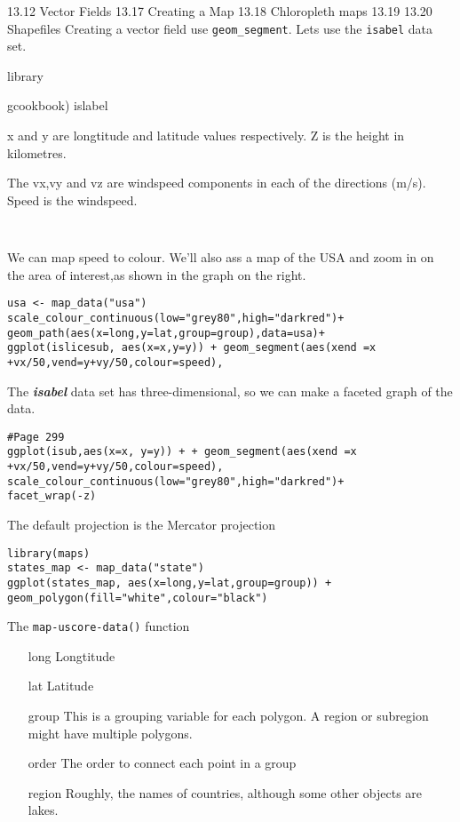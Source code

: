 13.12 Vector Fields
13.17 Creating a Map
13.18 Chloropleth maps
13.19 
13.20 Shapefiles
Creating a vector field
use \texttt{geom_segment}. Lets use the \texttt{isabel} data set.


library{gcookbook)
islabel

x and y are longtitude and latitude values respectively.
Z is the height in kilometres.

The vx,vy and vz are windspeed components in each of the directions (m/s).
Speed is the windspeed.

\begin{framed}
\begin{verbatim}


\end{verbatim}
\end{framed}

We can map speed to colour. We'll also ass a map of 
the USA and zoom in on the area of interest,as shown in the graph on the right.

\begin{verbatim}
usa <- map_data("usa")
scale_colour_continuous(low="grey80",high="darkred")+
geom_path(aes(x=long,y=lat,group=group),data=usa)+
ggplot(islicesub, aes(x=x,y=y)) + geom_segment(aes(xend =x +vx/50,vend=y+vy/50,colour=speed),
\end{verbatim}
The \textbf{\textit{isabel}} data set has three-dimensional, so we can make a faceted graph of the data.

\begin{verbatim}
#Page 299
ggplot(isub,aes(x=x, y=y)) + + geom_segment(aes(xend =x +vx/50,vend=y+vy/50,colour=speed),
scale_colour_continuous(low="grey80",high="darkred")+
facet_wrap(-z)
\end{verbatim}


The default projection is the Mercator projection

\begin{verbatim}
library(maps)
states_map <- map_data("state")
ggplot(states_map, aes(x=long,y=lat,group=group)) + geom_polygon(fill="white",colour="black")
\end{verbatim}

The \texttt{map-uscore-data()} function

\begin{itemize}
\item[long] Longtitude
\item[lat] Latitude
\item[group] This is a grouping variable for each polygon. A region or subregion might have multiple polygons.
\item[order] The order to connect each point in a group
\item[region] Roughly, the names of countries, although some other objects are lakes.
\end{itemize}

}

